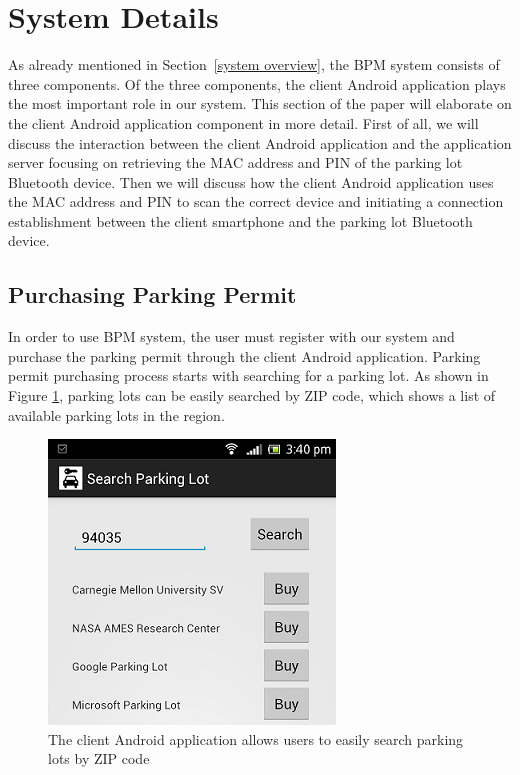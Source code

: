 \section{System Details}
As already mentioned in Section~\ref{system overview}, the BPM system consists of three components. Of the three components, the client Android application plays the most important role in our system. This section of the paper will elaborate on the client Android application component in more detail. First of all, we will discuss the interaction between the client Android application and the application server focusing on retrieving the MAC address and PIN of the parking lot Bluetooth device. Then we will discuss how the client Android application uses the MAC address and PIN to scan the correct device and initiating a connection establishment between the client smartphone and the parking lot Bluetooth device.

\subsection{Purchasing Parking Permit}
In order to use BPM system, the user must register with our system and purchase the parking permit through the client Android application. Parking permit purchasing process starts with searching for a parking lot. As shown in Figure \ref{fig:searching}, parking lots can be easily searched by ZIP code, which shows a list of available parking lots in the region.

\begin{figure}[ht]
	\centering
		\includegraphics[width=3in]{figure/sys_detail_search.png}
		\caption{The client Android application allows users to easily search parking lots by ZIP code}
	\label{fig:searching}
\end{figure}

